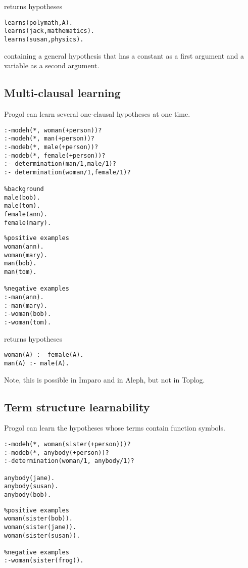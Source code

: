 returns hypotheses
\begin{lstlisting}
learns(polymath,A).
learns(jack,mathematics).
learns(susan,physics).
\end{lstlisting}
containing a general hypothesis  that has a constant  as a first argument and a variable as a second argument.

\subsection{Multi-clausal learning}\label{progol_multiclausal_learning}
Progol can learn several one-clausal hypotheses at one time.

\begin{minipage}[t]{.60\textwidth}
\begin{lstlisting}
:-modeh(*, woman(+person))?
:-modeh(*, man(+person))?
:-modeb(*, male(+person))?
:-modeb(*, female(+person))?
:- determination(man/1,male/1)?
:- determination(woman/1,female/1)?

%background
male(bob).
male(tom).
female(ann).
female(mary).\end{lstlisting}
\end{minipage}
\begin{minipage}[t]{.20\textwidth}
\begin{lstlisting}
%positive examples
woman(ann).
woman(mary).
man(bob).
man(tom).

%negative examples
:-man(ann).
:-man(mary).
:-woman(bob).
:-woman(tom).
\end{lstlisting}
\end{minipage}

returns hypotheses

\begin{lstlisting}
woman(A) :- female(A).
man(A) :- male(A).
\end{lstlisting}

Note, this is possible in Imparo and in Aleph, but not in Toplog.

\subsection{Term structure learnability}\label{progol_term_structure_learnability}
Progol can learn the hypotheses whose terms contain function symbols.

\begin{minipage}[t]{.60\textwidth}
\begin{lstlisting}
:-modeh(*, woman(sister(+person)))?
:-modeb(*, anybody(+person))?
:-determination(woman/1, anybody/1)?

anybody(jane).
anybody(susan).
anybody(bob).\end{lstlisting}
\end{minipage}
\begin{minipage}[t]{.20\textwidth}
\begin{lstlisting}
%positive examples
woman(sister(bob)).
woman(sister(jane)).
woman(sister(susan)).

%negative examples
:-woman(sister(frog)).
\end{lstlisting}
\end{minipage}

